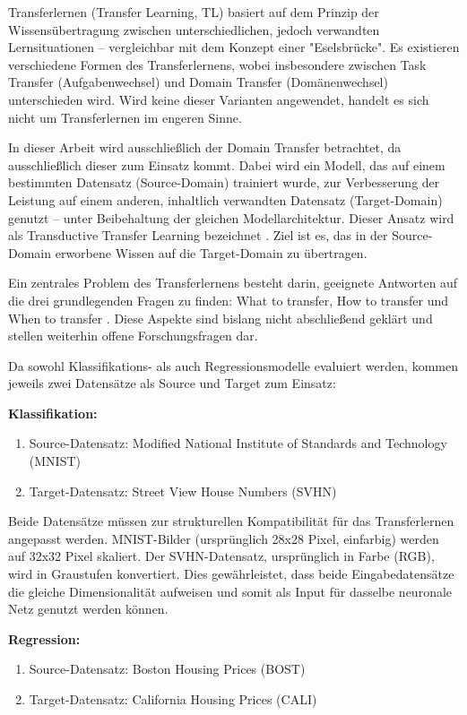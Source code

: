 Transferlernen (Transfer Learning, TL) basiert auf dem Prinzip der Wissensübertragung zwischen unterschiedlichen, jedoch verwandten 
Lernsituationen – vergleichbar mit dem Konzept einer "Eselsbrücke". Es existieren verschiedene Formen des Transferlernens, wobei 
insbesondere zwischen Task Transfer (Aufgabenwechsel) und Domain Transfer (Domänenwechsel) unterschieden wird. Wird keine dieser Varianten 
angewendet, handelt es sich nicht um Transferlernen im engeren Sinne.

In dieser Arbeit wird ausschließlich der Domain Transfer betrachtet, da ausschließlich dieser zum Einsatz kommt. Dabei wird ein Modell, das auf 
einem bestimmten Datensatz (Source-Domain) trainiert wurde, zur Verbesserung der Leistung auf einem anderen, inhaltlich verwandten Datensatz 
(Target-Domain) genutzt – unter Beibehaltung der gleichen Modellarchitektur. Dieser Ansatz wird als Transductive Transfer Learning bezeichnet 
\cite{survey_transfer}. Ziel ist es, das in der Source-Domain erworbene Wissen auf die Target-Domain zu übertragen.

Ein zentrales Problem des Transferlernens besteht darin, geeignete Antworten auf die drei grundlegenden Fragen zu finden: What to transfer, How 
to transfer und When to transfer \cite{survey_transfer}. Diese Aspekte sind bislang nicht abschließend geklärt und stellen weiterhin offene 
Forschungsfragen dar.

Da sowohl Klassifikations- als auch Regressionsmodelle evaluiert werden, kommen jeweils zwei Datensätze als Source und Target zum Einsatz:

\textbf{Klassifikation:}
\begin{enumerate}
    \item Source-Datensatz: Modified National Institute of Standards and Technology (MNIST) \cite{handwritten_digit}
    \item Target-Datensatz: Street View House Numbers (SVHN) \cite{house_numbers}
\end{enumerate}

Beide Datensätze müssen zur strukturellen Kompatibilität für das Transferlernen angepasst werden. MNIST-Bilder (ursprünglich 28x28 Pixel, 
einfarbig) werden auf 32x32 Pixel skaliert. Der SVHN-Datensatz, ursprünglich in Farbe (RGB), wird in Graustufen konvertiert. Dies gewährleistet, 
dass beide Eingabedatensätze die gleiche Dimensionalität aufweisen und somit als Input für dasselbe neuronale Netz genutzt werden können.

\textbf{Regression:}
\begin{enumerate}
    \item Source-Datensatz: Boston Housing Prices (BOST) \cite{Boston_housing}
    \item Target-Datensatz: California Housing Prices (CALI) \cite{California_housing}
\end{enumerate}

